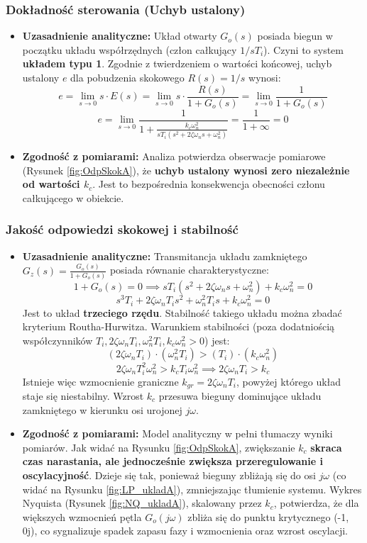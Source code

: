 \documentclass[12pt,a4paper]{article}
\begin{document}
	\subsubsection{Dokładność sterowania (Uchyb ustalony)}
	\begin{itemize}
		\item \textbf{Uzasadnienie analityczne:} Układ otwarty $G_o(s)$ posiada biegun w początku układu współrzędnych (człon całkujący $1/sT_i$). Czyni to system \textbf{układem typu 1}. Zgodnie z twierdzeniem o wartości końcowej, uchyb ustalony $e$ dla pobudzenia skokowego $R(s) = 1/s$ wynosi:
		\[
		e = \lim_{s \to 0} s \cdot E(s) = \lim_{s \to 0} s \cdot \frac{R(s)}{1 + G_o(s)} = \lim_{s \to 0} \frac{1}{1 + G_o(s)}
		\]
		\[
		e = \lim_{s \to 0} \frac{1}{1 + \frac{k_c \omega_n^2}{sT_i(s^2 + 2\zeta\omega_n s + \omega_n^2)}} = \frac{1}{1 + \infty} = 0
		\]
		\item \textbf{Zgodność z pomiarami:} Analiza potwierdza obserwacje pomiarowe (Rysunek \ref{fig:OdpSkokA}), że \textbf{uchyb ustalony wynosi zero niezależnie od wartości $k_c$}. Jest to bezpośrednia konsekwencja obecności członu całkującego w obiekcie.
	\end{itemize}
	
	\subsubsection{Jakość odpowiedzi skokowej i stabilność}
	\begin{itemize}
		\item \textbf{Uzasadnienie analityczne:} Transmitancja układu zamkniętego $G_z(s) = \frac{G_o(s)}{1 + G_o(s)}$ posiada równanie charakterystyczne:
		\[
		1 + G_o(s) = 0 \implies sT_i(s^2 + 2\zeta\omega_n s + \omega_n^2) + k_c \omega_n^2 = 0
		\]
		\[
		s^3 T_i + 2\zeta\omega_n T_i s^2 + \omega_n^2 T_i s + k_c \omega_n^2 = 0
		\]
		Jest to układ \textbf{trzeciego rzędu}. Stabilność takiego układu można zbadać kryterium Routha-Hurwitza. Warunkiem stabilności (poza dodatniością współczynników $T_i, 2\zeta\omega_n T_i, \omega_n^2 T_i, k_c \omega_n^2 > 0$) jest:
		\[
		(2\zeta\omega_n T_i) \cdot (\omega_n^2 T_i) > (T_i) \cdot (k_c \omega_n^2)
		\]
		\[
		2\zeta\omega_n T_i^2 \omega_n^2 > k_c T_i \omega_n^2 \implies 2\zeta\omega_n T_i > k_c
		\]
		Istnieje więc wzmocnienie graniczne $k_{gr} = 2\zeta\omega_n T_i$, powyżej którego układ staje się niestabilny. Wzrost $k_c$ przesuwa bieguny dominujące układu zamkniętego w kierunku osi urojonej $j\omega$.
		
		\item \textbf{Zgodność z pomiarami:} Model analityczny w pełni tłumaczy wyniki pomiarów. Jak widać na Rysunku \ref{fig:OdpSkokA}, zwiększanie $k_c$ \textbf{skraca czas narastania, ale jednocześnie zwiększa przeregulowanie i oscylacyjność}. Dzieje się tak, ponieważ bieguny zbliżają się do osi $j\omega$ (co widać na Rysunku \ref{fig:LP_ukladA}), zmniejszając tłumienie systemu. Wykres Nyquista (Rysunek \ref{fig:NQ_ukladA}), skalowany przez $k_c$, potwierdza, że dla większych wzmocnień pętla $G_o(j\omega)$ zbliża się do punktu krytycznego (-1, 0j), co sygnalizuje spadek zapasu fazy i wzmocnienia oraz wzrost oscylacji.
	\end{itemize}
	
\end{document}

